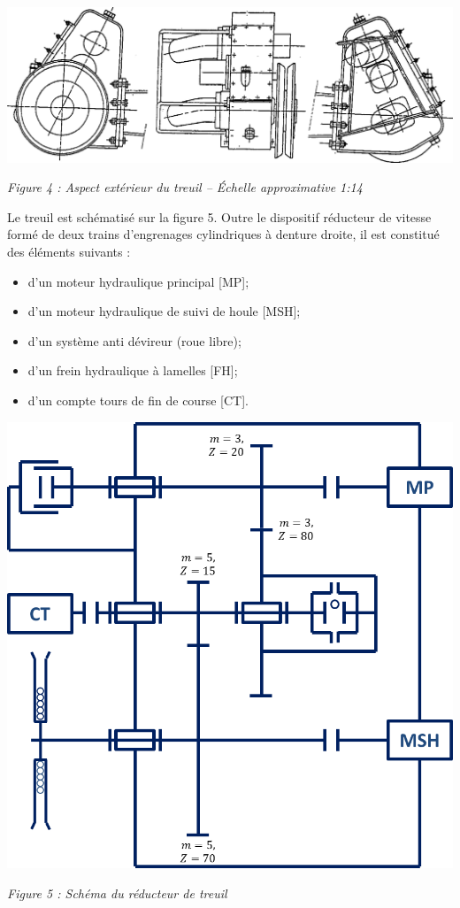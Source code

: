 \documentclass[10pt,fleqn]{article} %
\begin{document}
\begin{center}
\includegraphics[width=.95\textwidth]{images/Treuil}

\textit{Figure 4 : Aspect extérieur du treuil -- Échelle approximative 1:14}
\end{center}

\begin{minipage}[c]{.49\linewidth}
Le treuil est schématisé sur la figure 5. Outre le dispositif réducteur de vitesse formé de deux trains d'engrenages cylindriques à denture droite, il est constitué des éléments suivants : 
\begin{itemize}
\item d'un moteur hydraulique principal [MP];
\item d'un moteur hydraulique de suivi de houle [MSH];
\item d'un système anti dévireur (roue libre);
\item d'un frein hydraulique à lamelles [FH];
\item d'un compte tours de fin de course [CT].
\end{itemize}

\end{minipage} \hfill
\begin{minipage}[c]{.49\linewidth}
\begin{center}
\includegraphics[width=.8\textwidth]{images/schema}

\textit{Figure 5 : Schéma du réducteur de treuil}
\end{center}
\end{minipage} 
\end{document}
